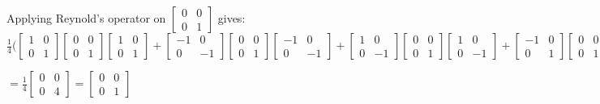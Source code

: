 \documentclass[a4paper]{article}
\begin{document}
Applying Reynold's operator on $\begin{bmatrix} 0 & 0 \\ 0 & 1 \end{bmatrix}$ gives:\\
$    \frac{1}{4} \Bigg(\begin{bmatrix} 1 & 0 \\ 0 & 1 \end{bmatrix} \begin{bmatrix} 0 & 0 \\ 0 & 1\end{bmatrix} \begin{bmatrix} 1 & 0 \\ 0 & 1 \end{bmatrix} + 
\begin{bmatrix} -1 & 0 \\ 0 & -1 \end{bmatrix} \begin{bmatrix} 0 & 0 \\ 0 & 1\end{bmatrix} \begin{bmatrix} -1 & 0 \\ 0 & -1 \end{bmatrix} +  
\begin{bmatrix} 1 & 0 \\ 0 & -1 \end{bmatrix} \begin{bmatrix} 0 & 0 \\ 0 & 1\end{bmatrix} \begin{bmatrix} 1 & 0 \\ 0 & -1 \end{bmatrix} + 
\begin{bmatrix} -1 & 0 \\ 0 & 1 \end{bmatrix} \begin{bmatrix} 0 & 0 \\ 0 & 1\end{bmatrix} \begin{bmatrix} -1 & 0 \\ 0 & 1 \end{bmatrix} \Bigg)$\\
\begin{center}
$= \frac{1}{4}\begin{bmatrix} 0 & 0 \\ 0 & 4 \end{bmatrix} = \begin{bmatrix} 0 & 0 \\ 0 & 1 \end{bmatrix} $
\end{center}
\end{document}
